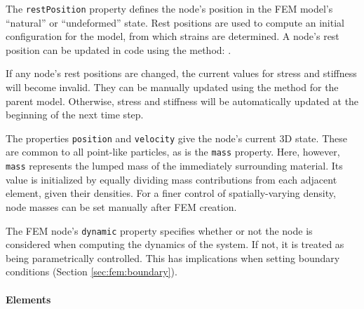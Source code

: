 The {\tt restPosition} property defines the node's position in the FEM model's 
``natural'' or ``undeformed'' state.  Rest positions are used to compute
an initial configuration for the model, from which strains are determined.  A
node's rest position can be updated in code using the method:
.

\begin{sideblock}
If any node's rest positions are changed, the current values 
for stress and stiffness will become invalid.  They can be manually
updated using the method  for the parent model. Otherwise,
stress and stiffness will be automatically updated at the beginning of the 
next time step. 
\end{sideblock}

The properties {\tt position} and {\tt velocity} give the node's current
3D state.  These are common to all point-like particles, as is the 
{\tt mass} property.  Here, however, {\tt mass} represents the lumped mass
of the immediately surrounding material.  Its value is initialized by equally
dividing mass contributions from each adjacent element, given their
densities.  For a finer control of spatially-varying density,
node masses can be set manually after FEM creation.

The FEM node's {\tt dynamic} property specifies whether or not the 
node is considered when computing the dynamics of the system.  If not,
it is treated as being parametrically controlled.  This has implications
when setting boundary conditions (Section \ref{sec:fem:boundary}).

\paragraph{Elements}
\ifLaTeXML{\newline}

